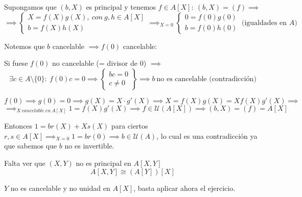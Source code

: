\documentclass[openany]{book}
\begin{document}
\setcounter{ex}{8}

\begin{exercise}
    $  $

    Supongamos que $ (b,X) $ es principal y tenemos $ f \in A[X]:\ (b,X) = (f) \implies $ 
    $$ \implies \left\{
    \begin{array}{l}
        X = f(X)g(X),\ con\ g,h \in A[X]\\
        b = f(X)h(X)
    \end{array}
    \right. 
    \implies_{X = 0} \left\{
    \begin{array}{l}
        0 = f(0)g(0)\\ b = f(0)h(0)
    \end{array}
    \right.\ \text{(igualdades en }A) $$

    Notemos que $ b $ cancelable $  \implies f(0) $ cancelable:

    Si fuese $ f(0)  $ no cancelable (= divisor de 0) $ \implies $
    $$ \exists c \in A \setminus \{0\}:\ f(0)c = 0 \implies \left\{
    \begin{array}{l}
        bc = 0\\ c\ne 0 
    \end{array}
    \right\} \implies b\ \text{no es cancelable (contradicción)} $$

    $$ f(0) \implies g(0) =0 \implies g(X) = X\cdot g'(X) \implies X = f(X)g(X) = X f(X)g'(X)\implies$$
    $$\implies_{X\ cancelable\ en\ A[X]} 1 = f(X)g'(X) \implies  f \in \mathcal{U}(A[X]) \implies (b,X) = (f) = A[X] $$

    Entonces $ 1 = br(X)+Xs(X) $ para ciertos $ r,s \in A[X] \implies_{X=0} 1 = br (0)\implies b \in \mathcal{U}(A)$, lo cual es una contradicción ya que sabemos que $ b $ no es invertible.

    Falta ver que $ (X,Y) $ no es principal en $ A[X,Y] $
    $$ A[X,Y] \cong (A[Y])[X] $$

    $ Y $ no es cancelable y no unidad en $ A[X] $, basta aplicar ahora el ejercicio.
\end{exercise}
\end{document}
